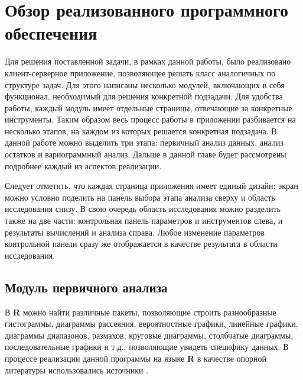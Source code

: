 
\newpage

\chapter{Обзор реализованного программного обеспечения}

Для решения поставленной задачи, в рамках данной работы, было реализовано клиент-серверное приложение, позволяющее решать класс аналогичных по структуре задач. Для этого написаны несколько модулей, включающих в себя функционал, необходимый для решения конкретной подзадачи. Для удобства работы, каждый модуль имеет отдельные страницы, отвечающие за конкретные инструменты. Таким образом весь процесс работы в приложении разбивается на несколько этапов, на каждом из которых решается конкретная подзадача. В данной работе можно выделить три этапа: первичный анализ данных, анализ остатков и вариограммный анализ. Дальше в данной главе будет рассмотрены подробнее каждый из аспектов реализации.

Следует отметить, что каждая страница приложения имеет единый дизайн: экран можно условно поделить на панель выбора этапа анализа сверху и область исследования снизу. В свою очередь область исследования можно разделить также на две части: контрольная панель параметров и инструментов слева, и результаты вычислений и анализа справа. Любое изменение параметров контрольной панели сразу же отображается в качестве результата в области исследования.

\section{Модуль первичного анализа} %
\label{sec:mod_basis}

В \textbf{R} можно найти различные пакеты, позволяющие строить разнообразные гистограммы, диаграммы рассеяния, вероятностные графики, линейные графики, диаграммы диапазонов, размахов, круговые диаграммы, столбчатые диаграммы, последовательные графики и т.д., позволяющие увидеть специфику данных. В процессе реализации данной программы на языке \textbf{R} в качестве опорной литературы использовались источники \cite{Kabacoff2009R, Teetor2011RCook, Chang2012RGraph}.

